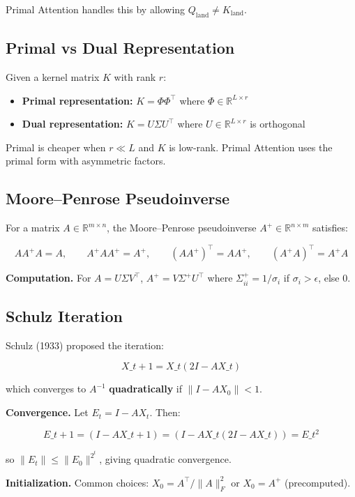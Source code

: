 Primal Attention handles this by allowing $Q_\text{land} \ne K_\text{land}$.

\subsection{Primal vs Dual Representation}

Given a kernel matrix $K$ with rank $r$:

\begin{itemize}
\item \textbf{Primal representation:} $K = \Phi \Phi^\top$ where $\Phi \in \mathbb{R}^{L \times r}$
\item \textbf{Dual representation:} $K = U \Sigma U^\top$ where $U \in \mathbb{R}^{L \times r}$ is orthogonal

\end{itemize}
Primal is cheaper when $r \ll L$ and $K$ is low-rank. Primal Attention uses 
the primal form with asymmetric factors.

\subsection{Moore--Penrose Pseudoinverse}

For a matrix $A \in \mathbb{R}^{m \times n}$, the Moore--Penrose pseudoinverse 
$A^+ \in \mathbb{R}^{n \times m}$ satisfies:

\[
A A^+ A = A, \qquad A^+ A A^+ = A^+, \qquad (A A^+)^\top = A A^+, \qquad (A^+ A)^\top = A^+ A
\]

\textbf{Computation.} For $A = U \Sigma V^\top$, $A^+ = V \Sigma^+ U^\top$ where 
$\Sigma^+_{ii} = 1/\sigma_i$ if $\sigma_i > \epsilon$, else $0$.

\subsection{Schulz Iteration}

Schulz (1933) proposed the iteration:

\[
X\_{t+1} = X\_t (2I - A X\_t)
\]

which converges to $A^{-1}$ \textbf{quadratically} if $\|I - A X_0\| < 1$.

\textbf{Convergence.} Let $E_t = I - A X_t$. Then:

\[
E\_{t+1} = (I - A X\_{t+1}) = (I - A X\_t (2I - A X\_t)) = E\_t^2
\]

so $\|E_t\| \le \|E_0\|^{2^t}$, giving quadratic convergence.

\textbf{Initialization.} Common choices: $X_0 = A^\top / \|A\|_F^2$ or $X_0 = A^+$ 
(precomputed).

